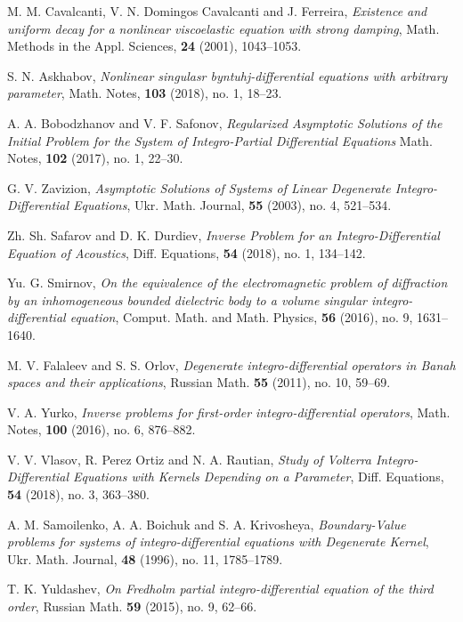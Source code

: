 ﻿\documentclass[
11pt,%
tightenlines,%
twoside,%
onecolumn,%
nofloats,%
nobibnotes,%
nofootinbib,%
superscriptaddress,%
noshowpacs,%
centertags]%
{revtex4}
\begin{document}
\begin{thebibliography}{20}

 M. M. Cavalcanti, V. N. Domingos Cavalcanti and J. Ferreira,  {\it Existence and uniform decay for a nonlinear viscoelastic equation with strong damping}, Math. Methods in the Appl. Sciences,  {\bf 24} (2001),  1043--1053.

 S. N. Askhabov, {\it Nonlinear singulasr byntuhj-differential equations with arbitrary parameter},  Math. Notes, {\bf 103} (2018), no. 1, 18--23. 

 A. A. Bobodzhanov and V. F. Safonov, {\it Regularized Asymptotic Solutions of the Initial Problem for the System of Integro-Partial Differential Equations} Math. Notes, {\bf 102} (2017), no. 1,  22--30.

 G. V. Zavizion, {\it Asymptotic Solutions of Systems of Linear Degenerate Integro-Differential Equations}, Ukr. Math. Journal, {\bf 55} (2003), no. 4,  521--534.

 Zh. Sh. Safarov and D. K. Durdiev, {\it Inverse Problem for an Integro-Differential Equation of Acoustics}, Diff. Equations,  {\bf 54} (2018), no. 1,  134--142.

 Yu. G. Smirnov, {\it On the equivalence of the electromagnetic problem of diffraction by an inhomogeneous bounded dielectric body to a volume singular integro-differential equation}, Comput. Math. and Math. Physics, {\bf 56} (2016), no. 9,  1631--1640.

 M. V. Falaleev and S. S. Orlov, {\it Degenerate integro-differential operators in Banah spaces and their applications}, Russian Math. {\bf 55} (2011), no. 10, 59--69.  

 V. A. Yurko, {\it Inverse problems for first-order integro-differential operators}, Math. Notes, {\bf 100} (2016), no. 6,  876--882.

 V. V. Vlasov, R. Perez Ortiz and N. A. Rautian, {\it Study of Volterra Integro-Differential Equations with Kernels Depending on a Parameter}, Diff. Equations, {\bf 54} (2018), no. 3,  363--380.

 A. M. Samoilenko, A. A. Boichuk and   S. A. Krivosheya,
 {\it Boundary-Value problems for systems of integro-differential equations with Degenerate Kernel}, Ukr. Math. Journal, {\bf 48} (1996),  no. 11,   1785--1789.
 
 T. K. Yuldashev, {\it On Fredholm partial integro-differential equation of the third order}, Russian Math. {\bf 59} (2015), no. 9, 62--66.


\end{thebibliography}
\end{document}
